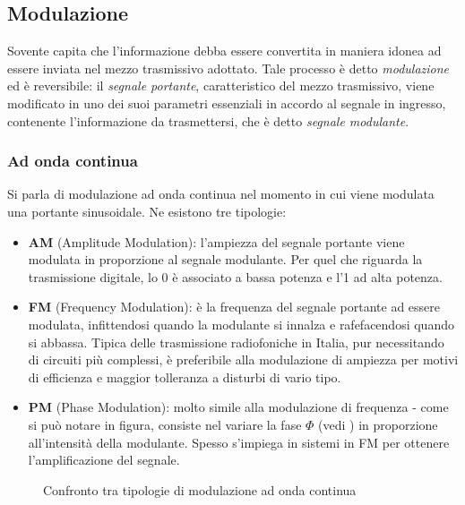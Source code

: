 \documentclass[a4paper,11pt]{article}
\def\sub#1{\subsection{#1}\label{#1}}
\def\subsub#1{\subsubsection{#1}\label{#1}}
\def\vedi#1{\nameref{#1}}
\begin{document}
\sub{Modulazione}
Sovente capita che l'informazione debba essere convertita in maniera idonea ad essere inviata nel mezzo trasmissivo adottato. Tale processo è detto \textit{modulazione} ed è reversibile: il \textit{segnale portante}, caratteristico del mezzo trasmissivo, viene modificato in uno dei suoi parametri essenziali in accordo al segnale in ingresso, contenente l'informazione da trasmettersi, che è detto \textit{segnale modulante}.
\subsub{Ad onda continua}
Si parla di modulazione ad onda continua nel momento in cui viene modulata una portante sinusoidale. Ne esistono tre tipologie:
\begin{itemize}
\item \textbf{AM} (Amplitude Modulation): l'ampiezza del segnale portante viene modulata in proporzione al segnale modulante. Per quel che riguarda la trasmissione digitale, lo 0 è associato a bassa potenza e l'1 ad alta potenza.
\item \textbf{FM} (Frequency Modulation): è la frequenza del segnale portante ad essere modulata, infittendosi quando la modulante si innalza e rafefacendosi quando si abbassa. Tipica delle trasmissione radiofoniche in Italia, pur necessitando di circuiti più complessi, è preferibile alla modulazione di ampiezza per motivi di efficienza e maggior tolleranza a disturbi di vario tipo.
\item \textbf{PM} (Phase Modulation): molto simile alla modulazione di frequenza - come si può notare in figura, consiste nel variare la fase $\Phi $ (vedi \vedi{Segnale}) in proporzione all'intensità della modulante. Spesso s'impiega in sistemi in FM per ottenere l'amplificazione del segnale. 
\end{itemize}
\begin{figure}[h]
\centering
{}
\caption{Confronto tra tipologie di modulazione ad onda continua}\label{fig. 2}
\end{figure}
\end{document}
